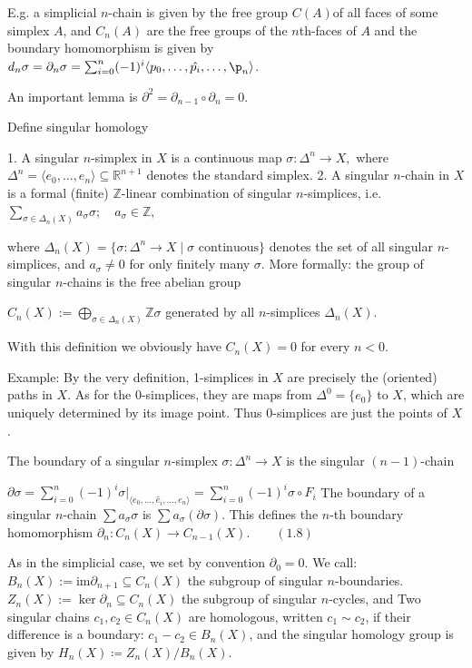 E.g. a simplicial \(n\)-chain is given by the free group \( C(A) \)of all faces of some simplex \( A \), and \( C_n(A) \) are the free groups of the \(n\)th-faces of \( A \)
and the boundary homomorphism is given by \( d_n\sigma = \partial_n \sigma = \sum_{i=0}^n (-1)^i \langle p_0, \dots, \hat{p_i}, \dots, \p_n \rangle \).

An important lemma is \( \partial^2 = \partial_{n-1} \circ \partial_n = 0 \).

Define singular homology

1. A singular \(n\)-simplex in \(X\) is a continuous map
\(\sigma: \Delta^n \to X,\)
where \(\Delta^n = \langle e_0, \dots, e_n \rangle \subseteq \mathbb{R}^{n+1}\) denotes the standard simplex.
2. A singular \(n\)-chain in \(X\) is a formal (finite) \(\mathbb{Z}\)-linear combination of singular \(n\)-simplices, i.e.
\(\sum_{\sigma \in \Delta_n(X)} a_\sigma \sigma; \quad a_\sigma \in \mathbb{Z}, \)

where \(\Delta_n(X) = \{\sigma: \Delta^n \to X \mid \sigma \text{ continuous}\}\) denotes the set of all singular \(n\)-simplices, and \(a_\sigma \neq 0\) for only finitely many \(\sigma\). 
More formally: the group of singular \(n\)-chains is the free abelian group

\(C_n(X) := \bigoplus_{\sigma \in \Delta_n(X)} \mathbb{Z} \sigma \)
generated by all \(n\)-simplices \(\Delta_n(X)\).

With this definition we obviously have \(C_n(X) = 0\) for every \(n < 0\).

Example: By the very definition, 1-simplices in \(X\) are precisely the (oriented) paths in \(X\). As for the 0-simplices, they are maps from \(\Delta^0 = \{e_0\}\) to \(X\), which are uniquely determined by its image point. Thus 0-simplices are just the points of \(X\). 

The boundary of a singular \(n\)-simplex \(\sigma: \Delta^n \to X\) is the singular \((n-1)\)-chain 

\(\partial \sigma = \sum_{i=0}^{n} (-1)^i \sigma|_{\langle e_0, \dots, \hat{e}_i, \dots, e_n \rangle} = \sum_{i=0}^{n} (-1)^i \sigma \circ F_i\)
The boundary of a singular \(n\)-chain \(\sum a_\sigma \sigma\) is \(\sum a_\sigma (\partial \sigma)\). This defines the \(n\)-th boundary homomorphism
\(\partial_n : C_n(X) \to C_{n-1}(X). \qquad (1.8)\)

As in the simplicial case, we set by convention \(\partial_0 = 0\). 
We call:
\(B_n(X) := \text{im} \partial_{n+1} \subseteq C_n(X)\) the subgroup of singular \(n\)-boundaries.
\(Z_n(X) := \ker \partial_n \subseteq C_n(X)\) the subgroup of singular \(n\)-cycles, and
Two singular chains \(c_1, c_2 \in C_n(X)\) are homologous, written \(c_1 \sim c_2\), if their difference is a boundary: \(c_1 - c_2 \in B_n(X)\),
and the singular homology group is given by \( H_n(X) \coloneqq Z_n(X)/B_n(X) \).

